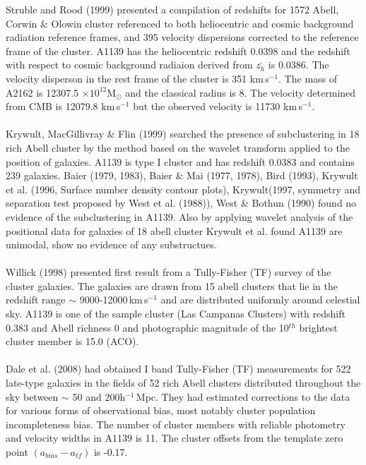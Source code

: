 Struble and Rood (1999) presented a compilation of redshifts for 1572 Abell, Corwin \& Olowin cluster referenced to both heliocentric and cosmic background radiation reference frames, and 395 velocity dispersions corrected to the reference frame of the cluster. A1139 has the heliocentric redshift 0.0398  and the redshift with respect to cosmic background radiaion derived from $\bar{z_h}$ is 0.0386. The velocity disperson in the rest frame of the cluster is 351 km\,s$^{-1}$. The mass of A2162 is 12307.5 $\times 10^{12}$M$_{\odot}$  and the classical radius is 8. The velocity determined from CMB is 12079.8 km\,s$^{-1}$ but the observed velocity is 11730 km\,s$^{-1}$.\\\\
Krywult, MacGillivray \& Flin (1999) searched the presence of subclustering in 18 rich Abell cluster by the method based on the wavelet transform applied to the position of galaxies. A1139 is type I cluster and has redshift 0.0383 and contains 239 galaxies. Baier (1979, 1983), Baier \& Mai (1977, 1978), Bird (1993), Krywult et al. (1996, Surface number density contour plots), Krywult(1997, symmetry and separation test proposed by West et al. (1988)), West \& Bothun (1990) found no evidence of the subclustering in A1139. Also by applying wavelet analysis of the positional data for galaxies of 18 abell cluster Krywult et al. found A1139 are unimodal, show no evidence of any substructues.\\\\
Willick (1998) presented first result from a Tully-Fisher (TF) survey of the cluster galaxies. The galaxies are drawn from 15 abell clusters that lie in the redshift range $\sim$ 9000-12000\,km\,s$^{-1}$ and are distributed uniformly around celestial sky. A1139 is one of the sample cluster (Las Campanas Clusters) with redshift 0.383 and Abell richness 0 and photographic magnitude of the 10$^{th}$ brightest cluster member is 15.0 (ACO).\\\\
Dale et al. (2008) had obtained I band Tully-Fisher (TF) measurements for 522 late-type galaxies in the fields of 52 rich Abell clusters distributed throughout the sky between $\sim$ 50 and 200h$^{-1}$\,Mpc. They had estimated corrections to the data for various forms of observational bias, most notably cluster population incompleteness bias. The number of cluster members with reliable photometry and velocity widths in A1139 is 11. The cluster offsets from the template zero point $(a_{bias}-a_{tf})$ is -0.17.\\\\
